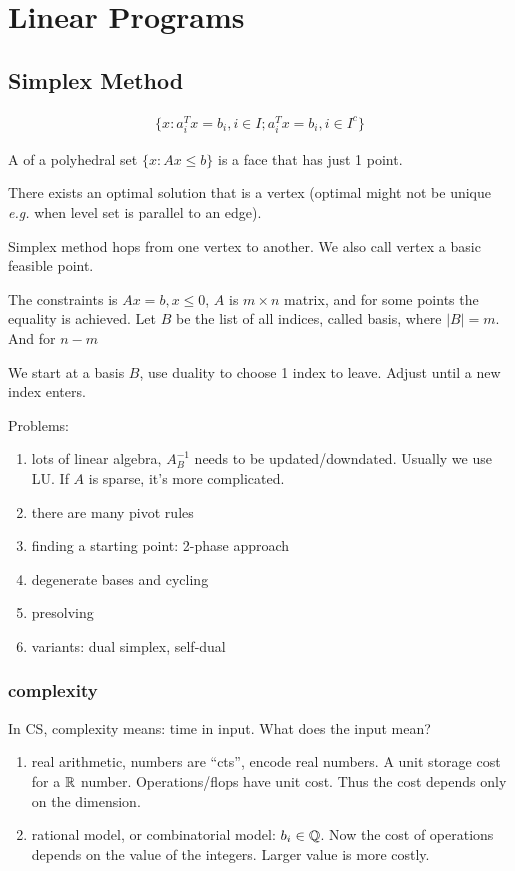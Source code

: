 \documentclass[class=article,crop=false]{standalone}
\begin{document}
\section{Linear Programs}
\subsection{Simplex Method}
\begin{defn}[face]
\begin{align*}
	\{x: a_i^{T}x=b_i, i \in I; a_i^{T}x=b_i, i \in I^{c}\} 
\end{align*}
\end{defn}

\begin{defn}[vertex]
A  of a polyhedral set $ \{x: Ax\leq b\} $ is a face that has just 1 point. 
\end{defn}

There exists an optimal solution that is a vertex (optimal might not be unique \emph{e.g.} when level set is parallel to an edge).

Simplex method hops from one vertex to another. We also call vertex a basic feasible point.

The constraints is $ Ax=b, x\leq 0$, $ A$ is  $ m\times n$ matrix, and for some points the equality is achieved. Let  $ B$ be the list of all indices, called basis, where  $ |B| = m$. And for $ n-m$  

We start at a basis $ B$, use duality to choose 1 index to leave. Adjust until a new index enters.

Problems:
 \begin{enumerate}[label=(\arabic*)]
	\item lots of linear algebra, $ A_B^{-1}$ needs to be updated/downdated. Usually we use LU. If $ A$ is sparse, it's more complicated.
	\item there are many pivot rules
	\item finding a starting point: 2-phase approach
	\item degenerate bases and cycling
	\item presolving
	\item variants: dual simplex, self-dual
\end{enumerate}

\subsubsection{complexity}
In CS, complexity means: time in input. What does the input mean?
\begin{enumerate}[label=(\arabic*)]
	\item real arithmetic, numbers are ``cts'', encode real numbers. A unit storage cost for a $ \mathbb{R}$ number. Operations/flops have unit cost. Thus the cost depends only on the dimension.
	\item rational model, or combinatorial model: $ b_i \in \mathbb{Q}$. Now the cost of operations depends on the value of the integers. Larger value is more costly.
\end{enumerate}
\end{document}
